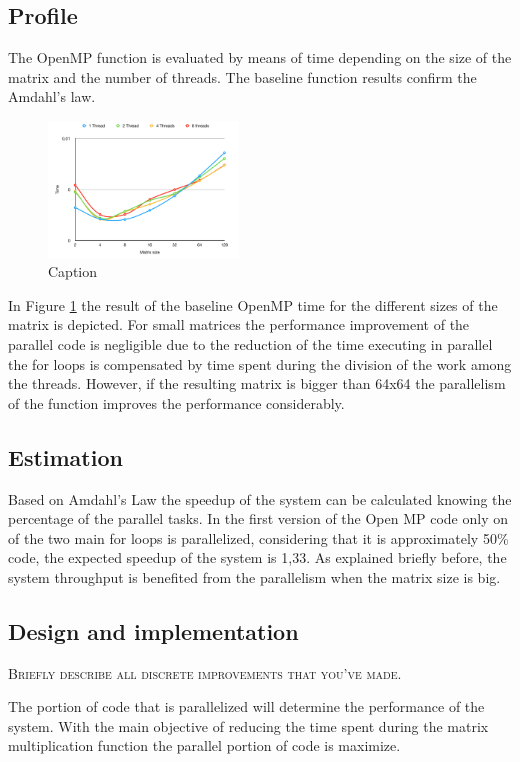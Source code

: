 \documentclass[twocolumn]{article}
\begin{document}
\subsection{Profile}
The  OpenMP function is evaluated by means of time depending on the size of the matrix and the number of threads.
The baseline function results confirm the Amdahl's law. 
\begin{figure}[h]
    \centering
    \includegraphics[width=0.45\textwidth]{OpenMP_bas.png}
    \caption{Caption}
    \label{fig:OpenMP_base}
\end{figure}

In  Figure \ref{fig:OpenMP_base} the result of the baseline OpenMP time for the different sizes of the matrix is depicted. For small matrices the performance improvement of the parallel code is negligible due to the reduction of the time executing in parallel  the for loops is compensated by time spent during the division of the work among the threads. However, if the resulting matrix is bigger than 64x64 the parallelism of the function improves the performance considerably. 


\subsection{Estimation}
Based on Amdahl's Law the speedup of the system can be calculated knowing the percentage of the parallel tasks.
In the first version of the Open MP code only on of the two main for loops  is parallelized, considering that it is approximately 50\% code, the expected speedup of the system is  1,33.
As explained briefly before, the system throughput is benefited from the parallelism when the matrix size is big.

\subsection{Design and implementation}
\textsc{Briefly describe all discrete improvements that you've made.}

The portion of code that is parallelized will determine the performance of the system.
With the main objective of reducing the time spent during the matrix multiplication function the parallel portion of code is maximize.
\end{document}
